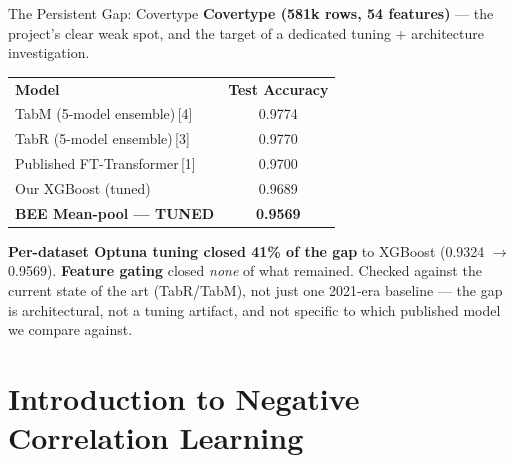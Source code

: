 \documentclass[aspectratio=169, xcolor=table]{beamer}
\begin{document}
\begin{frame}{The Persistent Gap: Covertype}
    \textbf{Covertype (581k rows, 54 features)} — the project's clear weak spot, and the target of a dedicated tuning + architecture investigation.
    \vspace{0.15cm}
    \begin{table}
        \centering
        \renewcommand{\arraystretch}{1.0}
        \small
        \begin{tabular}{l | c}
            \rowcolor{PrimaryColor} \color{white}\textbf{Model} & \color{white}\textbf{Test Accuracy} \\
            TabM (5-model ensemble)\,{\scriptsize[4]} & 0.9774 \\
            \rowcolor{LightGrey} TabR (5-model ensemble)\,{\scriptsize[3]} & 0.9770 \\
            Published FT-Transformer\,{\scriptsize[1]} & 0.9700 \\
            \rowcolor{LightGrey} Our XGBoost (tuned) & 0.9689 \\
            \rowcolor{SecondaryColor} \color{white}\textbf{BEE Mean-pool — TUNED} & \color{white}\textbf{0.9569} \\
        \end{tabular}
    \end{table}
    \vspace{0.15cm}
    \small
    \textbf{Per-dataset Optuna tuning closed 41\% of the gap} to XGBoost (0.9324 $\to$ 0.9569). \textbf{Feature gating} closed \textit{none} of what remained. Checked against the current state of the art (TabR/TabM), not just one 2021-era baseline — the gap is architectural, not a tuning artifact, and not specific to which published model we compare against.
\end{frame}

\section{Introduction to Negative Correlation Learning}
\end{document}
